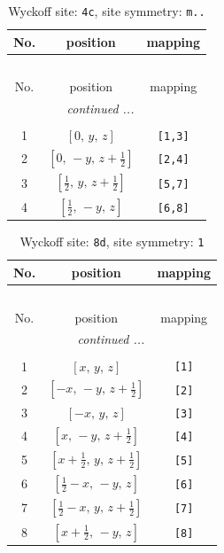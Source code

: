 \documentclass[fleqn,8pt]{jsarticle}
\begin{document}
\renewcommand{\arraystretch}{1.2}
\begin{longtable}{ccc}
\caption{Wyckoff site: {\tt 4c}, site symmetry: {\tt m..}}
 \\
 \hline \hline
No. & position & mapping \\ \hline \endfirsthead

\multicolumn{2}{l}{\tablename\ \thetable{}} \\
 \hline \hline
No. & position & mapping \\ \hline \endhead

 \hline \hline
\multicolumn{2}{r}{\footnotesize\it continued ...} \\ \endfoot

 \hline \hline
\multicolumn{2}{r}{} \\ \endlastfoot

1 & $\left[ 0,\, y,\, z \right]$ & {\tt [1,3]} \\ \hline
2 & $\left[ 0,\, - y,\, z + \frac{1}{2} \right]$ & {\tt [2,4]} \\ \hline
3 & $\left[ \frac{1}{2},\, y,\, z + \frac{1}{2} \right]$ & {\tt [5,7]} \\ \hline
4 & $\left[ \frac{1}{2},\, - y,\, z \right]$ & {\tt [6,8]} \\
\end{longtable}
\renewcommand{\arraystretch}{1.2}
\begin{longtable}{ccc}
\caption{Wyckoff site: {\tt 8d}, site symmetry: {\tt 1}}
 \\
 \hline \hline
No. & position & mapping \\ \hline \endfirsthead

\multicolumn{2}{l}{\tablename\ \thetable{}} \\
 \hline \hline
No. & position & mapping \\ \hline \endhead

 \hline \hline
\multicolumn{2}{r}{\footnotesize\it continued ...} \\ \endfoot

 \hline \hline
\multicolumn{2}{r}{} \\ \endlastfoot

1 & $\left[ x,\, y,\, z \right]$ & {\tt [1]} \\ \hline
2 & $\left[ - x,\, - y,\, z + \frac{1}{2} \right]$ & {\tt [2]} \\ \hline
3 & $\left[ - x,\, y,\, z \right]$ & {\tt [3]} \\ \hline
4 & $\left[ x,\, - y,\, z + \frac{1}{2} \right]$ & {\tt [4]} \\ \hline
5 & $\left[ x + \frac{1}{2},\, y,\, z + \frac{1}{2} \right]$ & {\tt [5]} \\ \hline
6 & $\left[ \frac{1}{2} - x,\, - y,\, z \right]$ & {\tt [6]} \\ \hline
7 & $\left[ \frac{1}{2} - x,\, y,\, z + \frac{1}{2} \right]$ & {\tt [7]} \\ \hline
8 & $\left[ x + \frac{1}{2},\, - y,\, z \right]$ & {\tt [8]} \\
\end{longtable}
\end{document}
